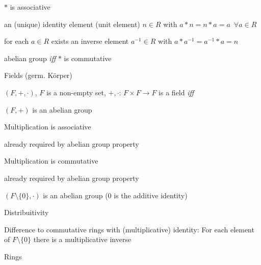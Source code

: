 \documentclass[landscape, a4paper]{article}
\begin{document}
\begin{minipage}[t]{0.2\linewidth}
\begin{betterlist}
\begin{betterlist}
\begin{betterlist}
				\begin{betterlist}
					\item $*$ is \alert{associative}
					\item an \alert{(unique) identity element} (unit element) $n \in R$ with $a * n = n * a = a \enspace\forall a\in R$
					\item for each $a\in R$ exists an \alert{inverse element} $a^{-1}\in R$ with $a * a^{-1} = a^{-1} * a = n$
				\end{betterlist}
				\item \alert{abelian group} \textit{iff} $*$ is commutative
			\end{betterlist}
			\begin{betterlist}
				\item \alert{Fields (germ. Körper)}
				\begin{betterlist}
					\item $(F, +, \cdot)$, $F$ is a non-empty set, $+,\cdot$: $F \times F \rightarrow F$ is a \alert{field} \textit{iff}
					\begin{betterlist}
						\item $(F, +)$ is an \alert{abelian group}
						\item \alert{Multiplication} is \alert{associative}
						\begin{betterlist}
							\item already required by \alert{abelian group} property
						\end{betterlist}
						\item \alert{Multiplication} is \alert{commutative}
						\begin{betterlist}
							\item already required by \alert{abelian group} property
						\end{betterlist}
						\item $(F\setminus \{0\}, \cdot)$ is an \alert{abelian group} ($0$ is the additive identity)
						\item \alert{Distribuitivity}
					\end{betterlist}
					\item \alert{Difference} to \alert{commutative rings} with (multiplicative) identity: For each element of $F\setminus\{0\}$ there is a multiplicative inverse
				\end{betterlist}
			\end{betterlist}
			\begin{betterlist}
				\item \alert{Rings}
				\begin{betterlist}

\end{betterlist}
\end{betterlist}
\end{betterlist}
\end{betterlist}
\end{minipage}
\end{document}
